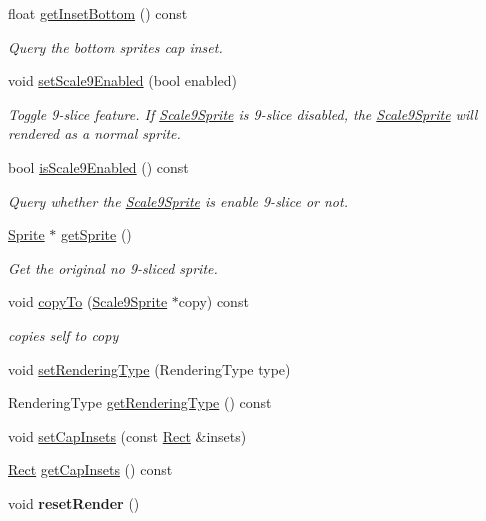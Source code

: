 \begin{DoxyCompactItemize}
float \hyperlink{classui_1_1Scale9Sprite_a1807c46e0dd049481acfee6b082657ba}{get\+Inset\+Bottom} () const
\begin{DoxyCompactList}\small\item\em Query the bottom sprite\textquotesingle{}s cap inset. \end{DoxyCompactList}\item 
void \hyperlink{classui_1_1Scale9Sprite_a1a1b73a9df09b09334e13b4e2f447038}{set\+Scale9\+Enabled} (bool enabled)
\begin{DoxyCompactList}\small\item\em Toggle 9-\/slice feature. If \hyperlink{classui_1_1Scale9Sprite}{Scale9\+Sprite} is 9-\/slice disabled, the \hyperlink{classui_1_1Scale9Sprite}{Scale9\+Sprite} will rendered as a normal sprite. \end{DoxyCompactList}\item 
bool \hyperlink{classui_1_1Scale9Sprite_a1bf8b2555d0f1b81d29bc44097a0c66d}{is\+Scale9\+Enabled} () const
\begin{DoxyCompactList}\small\item\em Query whether the \hyperlink{classui_1_1Scale9Sprite}{Scale9\+Sprite} is enable 9-\/slice or not. \end{DoxyCompactList}\item 
\hyperlink{classSprite}{Sprite} $\ast$ \hyperlink{classui_1_1Scale9Sprite_a22fb324eb7d6b34a3235d0e2dc91ac40}{get\+Sprite} ()
\begin{DoxyCompactList}\small\item\em Get the original no 9-\/sliced sprite. \end{DoxyCompactList}\item 
void \hyperlink{classui_1_1Scale9Sprite_a34feeb916d89aeb48649dc1daa22410b}{copy\+To} (\hyperlink{classui_1_1Scale9Sprite}{Scale9\+Sprite} $\ast$copy) const
\begin{DoxyCompactList}\small\item\em copies self to copy \end{DoxyCompactList}\item 
void \hyperlink{classui_1_1Scale9Sprite_a8c2f5c69134b3e363e62acf6ef28ea8b}{set\+Rendering\+Type} (Rendering\+Type type)
\item 
Rendering\+Type \hyperlink{classui_1_1Scale9Sprite_a19fd59e100f7b6636291f23088c19292}{get\+Rendering\+Type} () const
\item 
void \hyperlink{classui_1_1Scale9Sprite_a71cc0602798744ca6be3451b49239809}{set\+Cap\+Insets} (const \hyperlink{classRect}{Rect} \&insets)
\item 
\hyperlink{classRect}{Rect} \hyperlink{classui_1_1Scale9Sprite_ac8034c7282571d915a5b68bd824bbe16}{get\+Cap\+Insets} () const
\item 
\mbox{\label{classui_1_1Scale9Sprite_acb219450e7c7d1e2cb7563ac38775b81}} 
void {\bfseries reset\+Render} ()
\end{DoxyCompactItemize}
